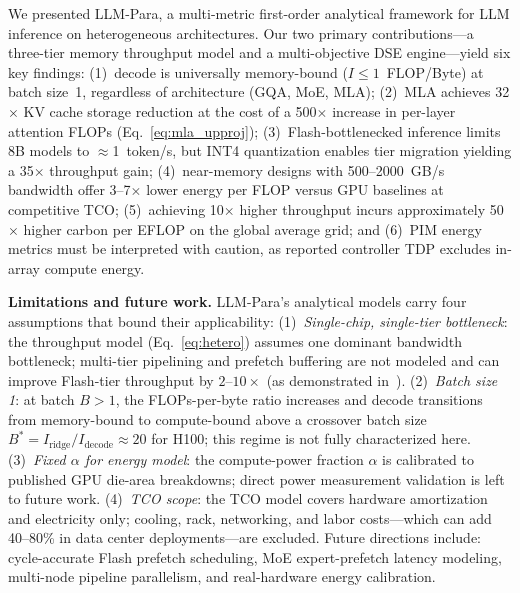 \documentclass[journal]{IEEEtran}
\begin{document}
We presented LLM-Para, a multi-metric first-order analytical framework
for LLM inference on heterogeneous architectures.
Our two primary contributions---a three-tier memory throughput model and
a multi-objective DSE engine---yield six key findings:
(1)~decode is universally memory-bound ($I \leq 1$~FLOP/Byte) at batch
size~1, regardless of architecture (GQA, MoE, MLA);
(2)~MLA achieves 32$\times$ KV cache storage reduction at the cost of a
500$\times$ increase in per-layer attention FLOPs (Eq.~\ref{eq:mla_upproj});
(3)~Flash-bottlenecked inference limits 8B models to
$\approx$1~token/s, but INT4 quantization enables tier migration yielding
a 35$\times$ throughput gain;
(4)~near-memory designs with 500--2000~GB/s bandwidth offer 3--7$\times$
lower energy per FLOP versus GPU baselines at competitive TCO;
(5)~achieving 10$\times$ higher throughput incurs approximately
50$\times$ higher carbon per EFLOP on the global average grid; and
(6)~PIM energy metrics must be interpreted with caution, as reported
controller TDP excludes in-array compute energy.

\noindent\textbf{Limitations and future work.}
LLM-Para's analytical models carry four assumptions that bound their
applicability:
(1)~\emph{Single-chip, single-tier bottleneck}: the throughput model
(Eq.~\ref{eq:hetero}) assumes one dominant bandwidth bottleneck;
multi-tier pipelining and prefetch buffering are not modeled and can
improve Flash-tier throughput by $2$--$10\times$ (as demonstrated
in~\cite{llminaflash}).
(2)~\emph{Batch size 1}: at batch $B>1$, the FLOPs-per-byte ratio
increases and decode transitions from memory-bound to compute-bound
above a crossover batch size $B^* = I_\text{ridge}/I_\text{decode}
\approx 20$ for H100; this regime is not fully characterized here.
(3)~\emph{Fixed $\alpha$ for energy model}: the compute-power fraction
$\alpha$ is calibrated to published GPU die-area breakdowns; direct
power measurement validation is left to future work.
(4)~\emph{TCO scope}: the TCO model covers hardware amortization and
electricity only; cooling, rack, networking, and labor costs---which
can add 40--80\% in data center deployments---are excluded.
Future directions include: cycle-accurate Flash prefetch scheduling,
MoE expert-prefetch latency modeling, multi-node pipeline parallelism,
and real-hardware energy calibration.
\end{document}
